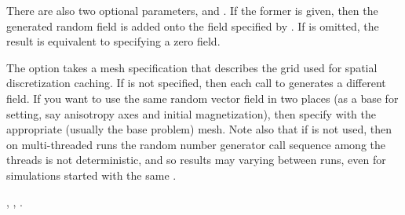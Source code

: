 \begin{description}
There are also two optional parameters,  and
. If the former is given, then the generated
random field is added onto the field specified by
.  If  is omitted, the
result is equivalent to specifying a zero field.

The  option takes a mesh specification that
describes the grid used for spatial discretization caching.  If
 is not specified, then each call to
 generates a different field.  If you want to
use the same random vector field in two places (as a base for setting,
say anisotropy axes and initial magnetization), then specify
 with the appropriate (usually the base problem)
mesh. Note also that if  is not used, then on
multi-threaded runs the random number generator call sequence among the
threads is not deterministic, and so results may varying between runs,
even for simulations started with the same
.

\begin{ExampleMifs}
  , , 
  .
\end{ExampleMifs}


\end{description}
